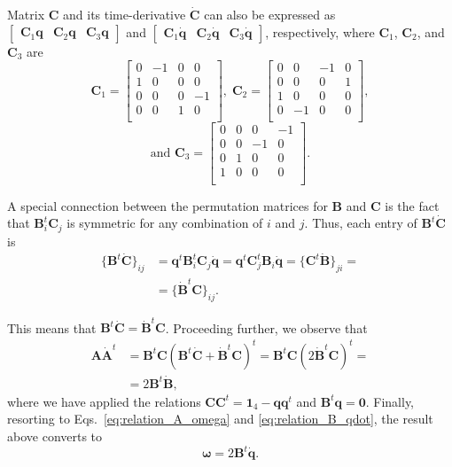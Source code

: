 \documentclass[aip,jcp,reprint,amsmath,amssymb,amsfont]{revtex4-1}
\newcommand{\mt}[1]{\boldsymbol{\mathbf{#1}}}           %
\newcommand{\vt}[1]{\boldsymbol{\mathbf{#1}}}           %
\newcommand{\tr}[1]{#1^t}                               %
\begin{document}
Matrix $\mt C$ and its time-derivative $\dot{\mt C}$ can also be expressed as $[\begin{array}{ccc}{\mt C}_1{\vt q} & {\mt C}_2{\vt q} & {\mt C}_3{\vt q}\end{array}]$ and $[\begin{array}{ccc}{\mt C}_1\dot{\vt q} & {\mt C}_2\dot{\vt q} & {\mt C}_3\dot{\vt q}\end{array}]$, respectively, where $\mt C_1$, $\mt C_2$, and $\mt C_3$ are
\[
{\mt C}_1 = \left[ \begin{array}{rrrr}
 0 & -1 &  0 &  0 \\
 1 &  0 &  0 &  0 \\
 0 &  0 &  0 & -1 \\
 0 &  0 &  1 &  0 \\
\end{array} \right], \;
{\mt C}_2 = \left[ \begin{array}{rrrr}
 0 &  0 & -1 &  0 \\
 0 &  0 &  0 &  1 \\
 1 &  0 &  0 &  0 \\
 0 & -1 &  0 &  0 \\
\end{array} \right],
\]\[
\text{and }{\mt C}_3 = \left[ \begin{array}{rrrr}
 0 &  0 &  0 & -1 \\
 0 &  0 & -1 &  0 \\
 0 &  1 &  0 &  0 \\
 1 &  0 &  0 &  0 \\
\end{array} \right].
\]

A special connection between the permutation matrices for $\mt B$ and $\mt C$ is the fact that $\tr{\mt B_i}{\mt C_j}$ is symmetric for any combination of $i$ and $j$. Thus, each entry of $\tr{\mt B}\dot{\mt C}$ is
\begin{align*}
\{\tr{\mt B}\dot{\mt C}\}_{ij} &= \tr{\vt q}\tr{\mt B}_i{\mt C}_j\dot{\vt q} = \tr{\vt q}\tr{\mt C}_j{\mt B}_i\dot{\vt q} = \{\tr{\mt C}\dot{\mt B}\}_{ji} = \\
&= \{\tr{\dot{\mt B}}\mt C\}_{ij}.
\end{align*}

This means that $\tr{\mt B}\dot{\mt C} = \tr{\dot{\mt B}}{\mt C}$. Proceeding further, we observe that
\begin{align*}
\mt A \tr{\dot{\mt A}} &= \tr{\mt B}\mt C \tr{(\tr{{\mt B}}\dot{\mt C} + \tr{\dot{\mt B}}{\mt C})} = \tr{\mt B}\mt C \tr{(2 \tr{\dot{\mt B}}{\mt C})} = \\
&= 2 \tr{\mt B}\dot{\mt B},
\end{align*}
where we have applied the relations $\mt C \tr{\mt C} = \mt 1_4 - \vt q\tr{\vt q}$ and $\tr{\vt B}\vt q = \vt 0$. Finally, resorting to Eqs.~\ref{eq:relation_A_omega} and \ref{eq:relation_B_qdot}, the result above converts to
\begin{equation}
\vt \omega = 2\tr{\mt B}\dot{\vt q}.
\end{equation}
\end{document}
